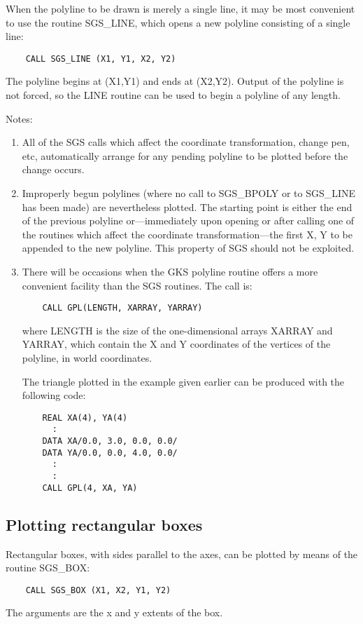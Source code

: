 When the polyline to be drawn is merely a single line, it may be most
convenient to use the routine SGS\_LINE, which opens a new polyline
consisting of a single line:
\begin{verbatim}
    CALL SGS_LINE (X1, Y1, X2, Y2)
\end{verbatim}
The polyline begins at (X1,Y1) and ends at (X2,Y2).  Output 
of the polyline is not forced, so the LINE routine
can be used to begin a polyline of any length.

Notes:
\begin{enumerate}
\item All of the SGS calls which affect the coordinate transformation,
change pen, etc,
automatically arrange for any pending
polyline to be plotted before the change occurs.
\item Improperly begun polylines (where no call to SGS\_BPOLY or to SGS\_LINE
has been made) are nevertheless plotted.  The starting point
is either the end of the previous polyline or---immediately upon
opening or after calling one of the routines which affect the
coordinate transformation---the first X, Y to be appended to
the new polyline.  This property of SGS should not be exploited.
\item There will be occasions when the GKS polyline routine
offers a more convenient facility than the SGS
routines.  The call is:
\begin{verbatim}
    CALL GPL(LENGTH, XARRAY, YARRAY)
\end{verbatim}
where LENGTH is the size of the one-dimensional arrays XARRAY and
YARRAY, which contain the X and Y coordinates of the vertices
of the polyline, in world coordinates.  

The triangle plotted in the example given earlier can be produced
with the following code:
\begin{verbatim}
    REAL XA(4), YA(4)
      :
    DATA XA/0.0, 3.0, 0.0, 0.0/
    DATA YA/0.0, 0.0, 4.0, 0.0/
      :
      :
    CALL GPL(4, XA, YA)
\end{verbatim}
\end{enumerate}

\subsection {Plotting rectangular boxes}
Rectangular boxes, with sides parallel to the axes, can be plotted
by means of the routine SGS\_BOX:
\begin{verbatim}
    CALL SGS_BOX (X1, X2, Y1, Y2)
\end{verbatim}
The arguments are the x and y extents of the box.

